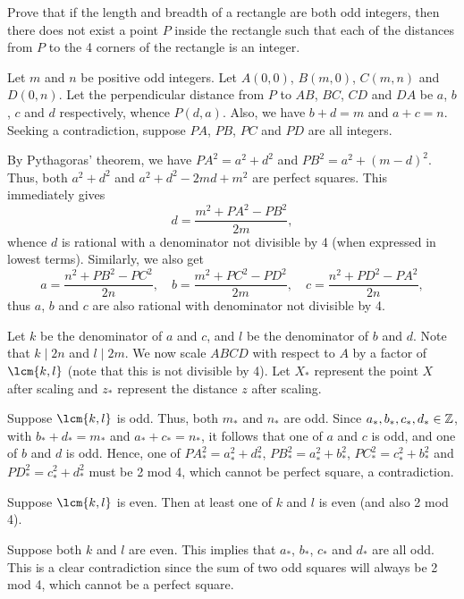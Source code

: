 \begin{question}\label{Q::2022-O-2-2}
    Prove that if the length and breadth of a rectangle are both odd integers, then there does not exist a point $P$ inside the rectangle such that each of the distances from $P$ to the 4 corners of the rectangle is an integer.
\end{question}
\begin{solution*}
    Let $m$ and $n$ be positive odd integers. Let $A(0, 0)$, $B(m, 0)$, $C(m, n)$ and $D(0, n)$. Let the perpendicular distance from $P$ to $AB$, $BC$, $CD$ and $DA$ be $a$, $b$, $c$ and $d$ respectively, whence $P(d, a)$. Also, we have $b + d = m$ and $a + c = n$. Seeking a contradiction, suppose $PA$, $PB$, $PC$ and $PD$ are all integers.

    By Pythagoras' theorem, we have $PA^2 = a^2 + d^2$ and $PB^2 = a^2 + (m-d)^2$. Thus, both $a^2 + d^2$ and $a^2 + d^2 - 2md + m^2$ are perfect squares. This immediately gives \[d = \frac{m^2 + PA^2 - PB^2}{2m},\] whence $d$ is rational with a denominator not divisible by 4 (when expressed in lowest terms). Similarly, we also get \[a = \frac{n^2 + PB^2 - PC^2}{2n}, \quad b = \frac{m^2 + PC^2 - PD^2}{2m}, \quad c = \frac{n^2 + PD^2 - PA^2}{2n},\] thus $a$, $b$ and $c$ are also rational with denominator not divisible by 4.

    Let $k$ be the denominator of $a$ and $c$, and $l$ be the denominator of $b$ and $d$. Note that $k \mid 2n$ and $l \mid 2m$. We now scale $ABCD$ with respect to $A$ by a factor of $\lcm{k, l}$ (note that this is not divisible by 4). Let $X_\ast$ represent the point $X$ after scaling and $z_\ast$ represent the distance $z$ after scaling.

     Suppose $\lcm{k, l}$ is odd. Thus, both $m_\ast$ and $n_\ast$ are odd. Since $a_\ast, b_\ast, c_\ast, d_\ast \in \mathbb{Z}$, with $b_\ast + d_\ast = m_\ast$ and $a_\ast + c_\ast = n_\ast$, it follows that one of $a$ and $c$ is odd, and one of $b$ and $d$ is odd. Hence, one of $PA_\ast^2 = a_\ast^2 + d_\ast^2$, $PB_\ast^2 = a_\ast^2 + b_\ast^2$, $PC_\ast^2 = c_\ast^2 + b_\ast^2$ and $PD_\ast^2 = c_\ast^2 + d_\ast^2$ must be 2 mod 4, which cannot be perfect square, a contradiction.

     Suppose $\lcm{k, l}$ is even. Then at least one of $k$ and $l$ is even (and also 2 mod 4). 

     Suppose both $k$ and $l$ are even. This implies that $a_\ast$, $b_\ast$, $c_\ast$ and $d_\ast$ are all odd. This is a clear contradiction since the sum of two odd squares will always be 2 mod 4, which cannot be a perfect square.


\end{solution*}
